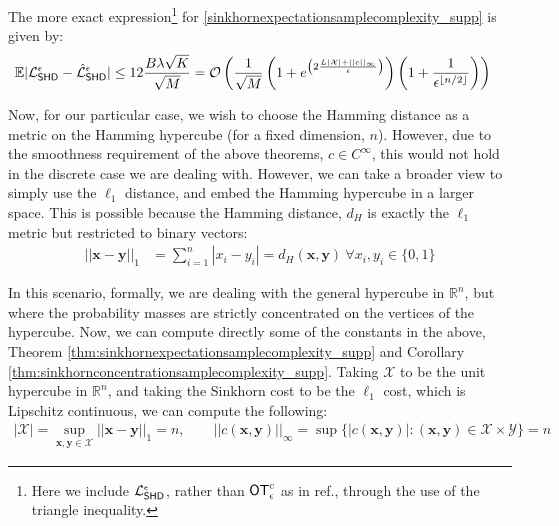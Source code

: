 The more exact expression\footnote{Here we include $\mathcal{L}_{\operatorname{\textsf{SHD}}}^\epsilon$, rather than $\operatorname{\textsf{OT}}_\epsilon^c$ as in ref.\cite{genevay_learning_2017}, through the use of the triangle inequality.} for \eqref{sinkhornexpectationsamplecomplexity_supp} is given by:
\begin{align}
     \mathbb{E}|\mathcal{L}_{\operatorname{\textsf{SHD}}}^\epsilon - \hat{\mathcal{L}}_{\operatorname{\textsf{SHD}}}^\epsilon| &\leq 12\frac{B\lambda\sqrt{K}}{\sqrt{M}}
     = \mathcal{O}\left(\frac{1}{\sqrt{M}}\left(1+e^{\left(2\frac{L|\mathcal{X}|+||c||_{\infty}}{\epsilon}\right)}\right)\left(1+\frac{1}{\epsilon^{\lfloor n/2\rfloor}}\right)\right)
\end{align}

\noindent Now, for our particular case, we wish to choose the Hamming distance as a metric on the Hamming hypercube (for a fixed dimension, $n$). However, due to the smoothness requirement of the above theorems, $c \in C^\infty$, this would not hold in the discrete case we are dealing with. However, we can take a broader view to simply use the $\ell_1$ distance, and embed the Hamming hypercube in a larger space. This is possible because the Hamming distance, $d_{H}$ is exactly the $\ell_1$ metric but restricted to binary vectors:
\begin{align}
    ||\mathbf{x} - \mathbf{y}||_1  & = \sum\limits_{i=1}^n|x_i-y_i| = d_H(\mathbf{x}, \mathbf{y}) ~ \forall x_i, y_i \in \{0, 1\} \label{samplecomplexityexpanded_supp}
\end{align}



\noindent In this scenario, formally, we are dealing with the general hypercube in $\mathbb{R}^n$, but where the probability masses are strictly concentrated on the vertices of the hypercube. Now, we can compute directly some of the constants in the above, Theorem \ref{thm:sinkhornexpectationsamplecomplexity_supp} and Corollary \ref{thm:sinkhornconcentrationsamplecomplexity_supp}. Taking $\mathcal{X}$ to be the unit hypercube in $\mathbb{R}^n$, and taking the Sinkhorn cost to be the $\ell_1$ cost, which is Lipschitz continuous, we can compute the following:
\begin{align}
    |\mathcal{X}| = \sup_{\mathbf{x}, \mathbf{y} \in \mathcal{X}}||\mathbf{x} - \mathbf{y}||_1= n,\qquad
    ||c(\mathbf{x}, \mathbf{y})||_\infty = \sup\{|c(\mathbf{x}, \mathbf{y})| : (\mathbf{x}, \mathbf{y}) \in \mathcal{X}\times \mathcal{Y}\} = n\label{sinkhorn_sample_complexity_calcs}
\end{align}
 
